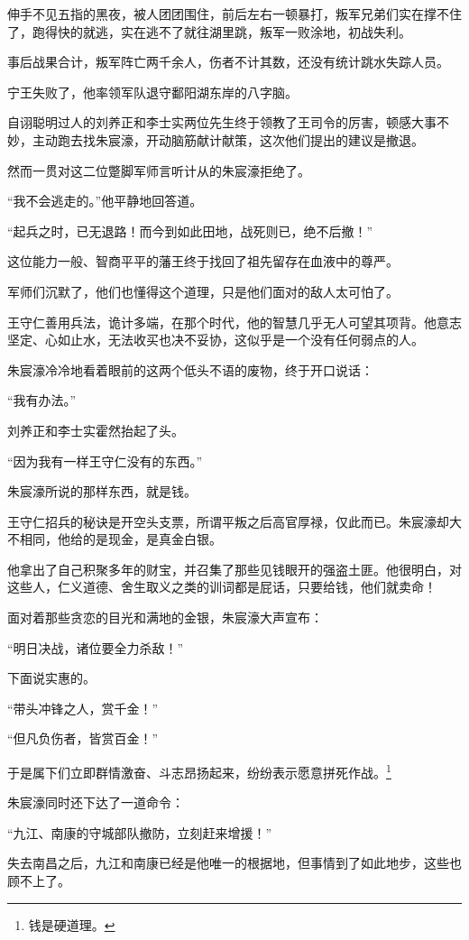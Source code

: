 \begin{multicols}{\theparacolNo}
伸手不见五指的黑夜，被人团团围住，前后左右一顿暴打，叛军兄弟们实在撑不住了，跑得快的就逃，实在逃不了就往湖里跳，叛军一败涂地，初战失利。

事后战果合计，叛军阵亡两千余人，伤者不计其数，还没有统计跳水失踪人员。

宁王失败了，他率领军队退守鄱阳湖东岸的八字脑。

自诩聪明过人的刘养正和李士实两位先生终于领教了王司令的厉害，顿感大事不妙，主动跑去找朱宸濠，开动脑筋献计献策，这次他们提出的建议是撤退。

然而一贯对这二位蹩脚军师言听计从的朱宸濠拒绝了。

“我不会逃走的。”他平静地回答道。

“起兵之时，已无退路！而今到如此田地，战死则已，绝不后撤！”

这位能力一般、智商平平的藩王终于找回了祖先留存在血液中的尊严。

军师们沉默了，他们也懂得这个道理，只是他们面对的敌人太可怕了。

王守仁善用兵法，诡计多端，在那个时代，他的智慧几乎无人可望其项背。他意志坚定、心如止水，无法收买也决不妥协，这似乎是一个没有任何弱点的人。

朱宸濠冷冷地看着眼前的这两个低头不语的废物，终于开口说话：

“我有办法。”

刘养正和李士实霍然抬起了头。

“因为我有一样王守仁没有的东西。”

朱宸濠所说的那样东西，就是钱。

王守仁招兵的秘诀是开空头支票，所谓平叛之后高官厚禄，仅此而已。朱宸濠却大不相同，他给的是现金，是真金白银。

他拿出了自己积聚多年的财宝，并召集了那些见钱眼开的强盗土匪。他很明白，对这些人，仁义道德、舍生取义之类的训词都是屁话，只要给钱，他们就卖命！

面对着那些贪恋的目光和满地的金银，朱宸濠大声宣布：

“明日决战，诸位要全力杀敌！”

下面说实惠的。

“带头冲锋之人，赏千金！”

“但凡负伤者，皆赏百金！”

于是属下们立即群情激奋、斗志昂扬起来，纷纷表示愿意拼死作战。\footnote{钱是硬道理。}

朱宸濠同时还下达了一道命令：

“九江、南康的守城部队撤防，立刻赶来增援！”

失去南昌之后，九江和南康已经是他唯一的根据地，但事情到了如此地步，这些也顾不上了。


\end{multicols}
